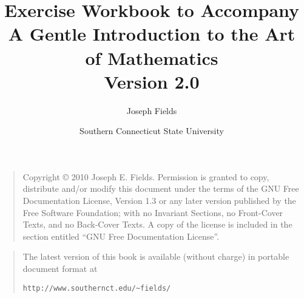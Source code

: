 \documentclass[dvips,12pt,twoside]{book}
\begin{document}
\frontmatter

\title{Exercise Workbook to Accompany \\
A Gentle Introduction to the Art of Mathematics\\ {\small Version 2.0}}
\author{Joseph Fields}
\date{Southern Connecticut State University}

\maketitle

\clearpage

\rule{0pt}{0pt}

\vfill

\begin{quote}
    Copyright \copyright{}  2010  Joseph E. Fields.
    Permission is granted to copy, distribute and/or modify this document
    under the terms of the GNU Free Documentation License, Version 1.3
    or any later version published by the Free Software Foundation;
    with no Invariant Sections, no Front-Cover Texts, and no Back-Cover Texts.
    A copy of the license is included in the section entitled ``GNU
    Free Documentation License''.
\end{quote}

\vfill

\begin{quote}
The latest version of this book is available (without charge) in portable document format at \newline
\rule{0pt}{0pt} \hspace{1in} \verb+http://www.southernct.edu/~fields/+
\end{quote}

\vfill

\clearpage

\mainmatter











{}%

\end{document}
